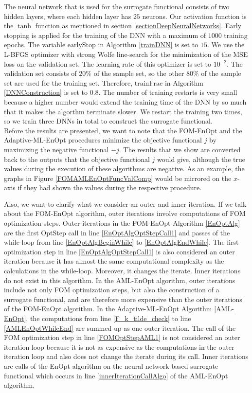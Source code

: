 The neural network that is used for the surrogate functional consists of two hidden layers, where each hidden layer has $25$ neurons. Our activation function is the $\tanh$ function as mentioned in section \ref{sectionDeepNeuralNetworks}. Early stopping is applied for the training of the DNN with a maximum of $1000$ training epochs. The variable $\mathrm{earlyStop}$ in Algorithm \ref{trainDNN} is set to $15$. We use the L-BFGS optimizer with strong Wolfe line-search for the minimization of the MSE loss on the validation set. The learning rate of this optimizer is set to $10^{-2}$. The validation set consists of $20\%$ of the sample set, so the other $80\%$ of the sample set are used for the training set. Therefore, $\mathrm{trainFrac}$ in Algorithm \ref{DNNConstruction} is set to $0.8$. The number of training restarts is very small because a higher number would extend the training time of the DNN by so much that it makes the algorthm terminate slower. We restart the training two times, so we train three DNNs in total to construct the surrogate functional.\\

Before the results are presented, we want to note that the FOM-EnOpt and the Adaptive-ML-EnOpt procedures minimize the objective functional $j$ by maximizing the negative functional $-j$. The results that we show are converted back to the outputs that the objective functional $j$ would give, although the true values during the execution of these algorithms are negative. As an example, the graphs in Figure \ref{FOMAMLEnOptFuncValComp} would be mirrored on the $x$-axis if they had shown the values during the respective procedure.

Also, we want to clarify what we consider an outer and inner iteration. If we talk about the FOM-EnOpt algorithm, outer iterations involve computations of FOM optimization steps. Outer iterations in the FOM-EnOpt Algorithm \ref{EnOptAlg} are the first OptStep call in line \ref{EnOptAlgOptStepCall1} and passes of the while-loop from line \ref{EnOptAlgBeginWhile} to \ref{EnOptAlgEndWhile}. The first optimization step in line \ref{EnOptAlgOptStepCall1} is also considered an outer iteration because it has almost the same computational complexity as the calculations in the while-loop. Moreover, it changes the iterate. Inner iterations do not exist in this algorithm. In the AML-EnOpt algorithm, outer iterations include not only FOM optimization steps, but also the construction of a surrogate functional, and are therefore more expensive than the outer iterations of the FOM-EnOpt algorithm. In the Adaptive-ML-EnOpt Algorithm \ref{AML-EnOpt}, the computations from line \ref{F_k_tilde_check} to line \ref{AMLEnOptWhileEnd} are summed up as one outer iteration. The call of the FOM optimization step in line \ref{FOMOptStepAML1} is not considered an outer iteration loop because it is not as expensive as the computations in the outer iteration loop and also does not change the iterate during its call. Inner iterations are calls of the EnOpt algorithm on the neural network-based surrogate functional which occurs in line \ref{innerIterationCallAlgo} of the AML-EnOpt algorithm.

